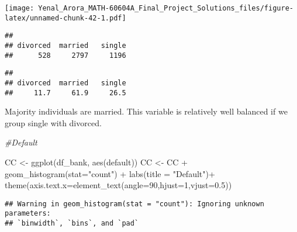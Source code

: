 \documentclass[
]{article}
\newenvironment{Shaded}{\begin{snugshade}}{\end{snugshade}}
\newcommand{\AttributeTok}[1]{\textcolor[rgb]{0.77,0.63,0.00}{#1}}
\newcommand{\CommentTok}[1]{\textcolor[rgb]{0.56,0.35,0.01}{\textit{#1}}}
\newcommand{\DecValTok}[1]{\textcolor[rgb]{0.00,0.00,0.81}{#1}}
\newcommand{\FloatTok}[1]{\textcolor[rgb]{0.00,0.00,0.81}{#1}}
\newcommand{\FunctionTok}[1]{\textcolor[rgb]{0.00,0.00,0.00}{#1}}
\newcommand{\NormalTok}[1]{#1}
\newcommand{\OtherTok}[1]{\textcolor[rgb]{0.56,0.35,0.01}{#1}}
\newcommand{\SpecialCharTok}[1]{\textcolor[rgb]{0.00,0.00,0.00}{#1}}
\newcommand{\StringTok}[1]{\textcolor[rgb]{0.31,0.60,0.02}{#1}}
\begin{document}
\texttt{[image: Yenal\_Arora\_MATH-60604A\_Final\_Project\_Solutions\_files/figure-latex/unnamed-chunk-42-1.pdf]}

\begin{Shaded}
\end{Shaded}

\begin{verbatim}
## 
## divorced  married   single 
##      528     2797     1196
\end{verbatim}

\begin{Shaded}
\end{Shaded}

\begin{verbatim}
## 
## divorced  married   single 
##     11.7     61.9     26.5
\end{verbatim}

Majority individuals are married. This variable is relatively well
balanced if we group single with divorced.

\begin{Shaded}
\begin{Highlighting}[]
\CommentTok{\#Default}

\NormalTok{CC }\OtherTok{\textless{}{-}} \FunctionTok{ggplot}\NormalTok{(df\_bank, }\FunctionTok{aes}\NormalTok{(default))}
\NormalTok{CC }\OtherTok{\textless{}{-}}\NormalTok{ CC  }\SpecialCharTok{+} \FunctionTok{geom\_histogram}\NormalTok{(}\AttributeTok{stat=}\StringTok{"count"}\NormalTok{) }\SpecialCharTok{+} \FunctionTok{labs}\NormalTok{(}\AttributeTok{title =} \StringTok{"Default"}\NormalTok{)}\SpecialCharTok{+}
  \FunctionTok{theme}\NormalTok{(}\AttributeTok{axis.text.x=}\FunctionTok{element\_text}\NormalTok{(}\AttributeTok{angle=}\DecValTok{90}\NormalTok{,}\AttributeTok{hjust=}\DecValTok{1}\NormalTok{,}\AttributeTok{vjust=}\FloatTok{0.5}\NormalTok{))}
\end{Highlighting}
\end{Shaded}

\begin{verbatim}
## Warning in geom_histogram(stat = "count"): Ignoring unknown parameters:
## `binwidth`, `bins`, and `pad`
\end{verbatim}
\end{document}
